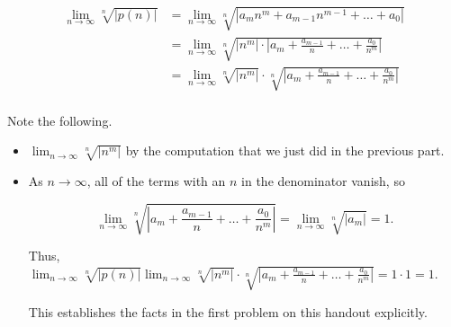 \documentclass[noauthor,handout]{ximera}
\begin{document}
\begin{problem}
\begin{freeResponse}
\begin{align*}
\lim_{n \to \infty} \sqrt[n]{|p(n)|} &= \lim_{n \to \infty} \sqrt[n]{\left|a_mn^m+a_{m-1}n^{m-1}+ \ldots + a_0\right|} \\
&= \lim_{n \to \infty} \sqrt[n]{\left|n^m\right| \cdot \left|a_m+\frac{a_{m-1}}{n}+ \ldots + \frac{a_0}{n^m}\right|} \\
&= \lim_{n \to \infty} \sqrt[n]{\left|n^m\right|} \cdot  \sqrt[n]{\left|a_m+\frac{a_{m-1}}{n}+ \ldots + \frac{a_0}{n^m}\right|} \\
\end{align*}

Note the following.
\begin{itemize}
\item $\lim_{n \to \infty} \sqrt[n]{\left|n^m\right|}$ by the computation that we just did in the previous part.
\item As $n \to \infty$, all of the terms with an $n$ in the denominator vanish, so 

\[
\lim_{n \to \infty} \sqrt[n]{\left|a_m+\frac{a_{m-1}}{n}+ \ldots + \frac{a_0}{n^m}\right|}  = \lim_{n \to \infty} \sqrt[n]{\left|a_m\right|} = 1.
\]

Thus, $\lim_{n \to \infty} \sqrt[n]{|p(n)|}  \lim_{n \to \infty} \sqrt[n]{\left|n^m\right|} \cdot  \sqrt[n]{\left|a_m+\frac{a_{m-1}}{n}+ \ldots + \frac{a_0}{n^m}\right|} = 1 \cdot 1 =1$.

This establishes the facts in the first problem on this handout explicitly.
\end{itemize}
\end{freeResponse}
\end{problem}
\end{document}
